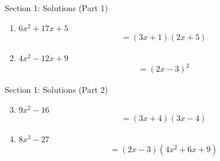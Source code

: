 \documentclass[aspectratio=169]{beamer}
\begin{document}
\begin{frame}{Section 1: Solutions (Part 1)}
    \begin{tcolorbox}[colback=lightgray,colframe=accent,title=Detailed Solutions]
        \footnotesize
        \begin{enumerate}
            \item $6x^2 + 17x + 5$
            \begin{align*}
                &= (3x + 1)(2x + 5)
            \end{align*}
            
            \item $4x^2 - 12x + 9$
            \begin{align*}
                &= (2x - 3)^2
            \end{align*}
        \end{enumerate}
    \end{tcolorbox}
\end{frame}

\begin{frame}{Section 1: Solutions (Part 2)}
    \begin{tcolorbox}[colback=lightgray,colframe=accent,title=Detailed Solutions (Continued)]
        \footnotesize
        \begin{enumerate}
            \setcounter{enumi}{2}
            \item $9x^2 - 16$
            \begin{align*}
                &= (3x + 4)(3x - 4)
            \end{align*}
            
            \item $8x^3 - 27$
            \begin{align*}
                &= (2x - 3)(4x^2 + 6x + 9)
            \end{align*}
        \end{enumerate}
    \end{tcolorbox}
\end{frame}
\end{document}
